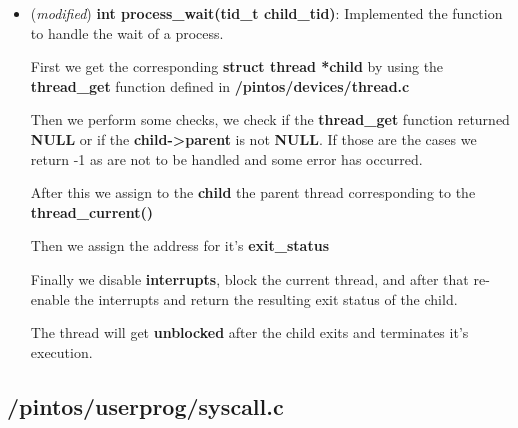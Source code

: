 \documentclass[11pt]{scrartcl}
\begin{document}
\begin{itemize}
    \item (\textit{modified}) \textbf{int process\_wait(tid\_t child\_tid)}:
          Implemented the function to handle the wait of a process.

          First we get the corresponding \textbf{struct thread *child} by using the \textbf{thread\_get} function defined in \textbf{/pintos/devices/thread.c}

          Then we perform some checks, we check if the \textbf{thread\_get} function returned \textbf{NULL} or if the \textbf{child->parent} is not \textbf{NULL}.
          If those are the cases we return -1 as are not to be handled and some error has occurred.

          After this we assign to the \textbf{child} the parent thread corresponding to the \textbf{thread\_current()}

          Then we assign the address for it's \textbf{exit\_status}

          Finally we disable \textbf{interrupts}, block the current thread, and after that re-enable the interrupts and return the resulting exit status of the child.

          The thread will get \textbf{unblocked} after the child exits and terminates it's execution.
\end{itemize}




\subsection*{/pintos/userprog/syscall.c}
\end{document}
